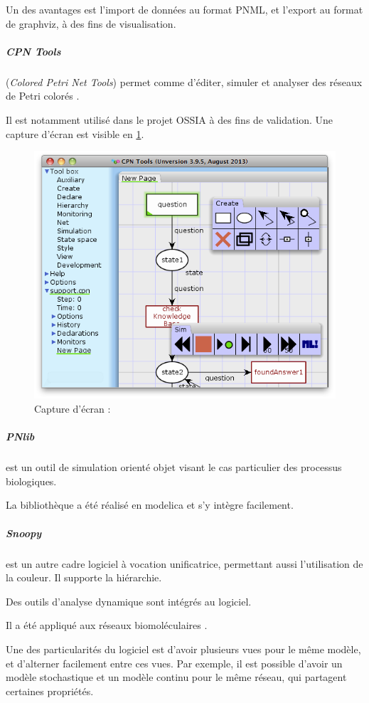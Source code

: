Un des avantages est l'import de données au format \ac{PNML}, et l'export au format  de \gls{graphviz}, à des fins de visualisation.

\subparagraph{CPN Tools} (\textit{Colored Petri Net Tools}) permet comme  d'éditer, simuler et analyser des réseaux de Petri colorés \cite{jensen2007coloured}.

Il est notamment utilisé dans le projet \ac{OSSIA} à des fins de validation. Une capture d'écran est visible en \cref{fig.cpntools}.

\begin{figure}[H]
	\centering
	\includegraphics[scale=0.3]{images/cpntools.png}
	\caption{Capture d'écran : }
	\label{fig.cpntools}
\end{figure}

\subparagraph{PNlib} \cite{pross2014object} est un outil de simulation orienté objet visant le cas particulier des processus biologiques.

La bibliothèque a été réalisé en \gls{modelica} et s'y intègre facilement.

\subparagraph{Snoopy} \cite{heiner2012snoopy} est un autre cadre logiciel à vocation unificatrice, permettant aussi l'utilisation de la couleur. Il supporte la hiérarchie.

Des outils d'analyse dynamique sont intégrés au logiciel.

Il a été appliqué aux réseaux biomoléculaires \cite{rohr2010snoopy}.

Une des particularités du logiciel est d'avoir plusieurs vues pour le même modèle, et d'alterner facilement entre ces vues. Par exemple, il est possible d'avoir un modèle stochastique et un modèle continu pour le même réseau, qui partagent certaines propriétés.

